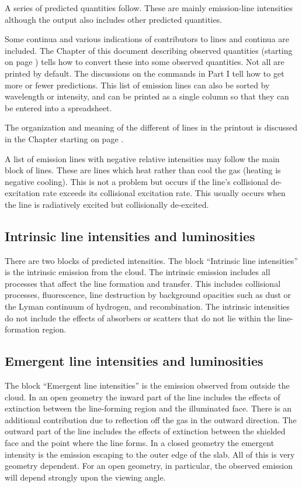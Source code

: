 A series of predicted quantities follow.
These are mainly emission-line
intensities although the output also includes other predicted quantities.

Some continua and various indications of contributors to lines and
continua are included.
The Chapter of this document describing observed
quantities (starting on page \pageref{sec:ObservedQuantities})
tells how to convert these into some observed quantities.
Not all
are printed by default.
The discussions on the  commands in Part I
tell how to get more or fewer predictions.
This list
of emission lines can also be sorted by wavelength or intensity, and can
be printed as a single column so that they can be entered into a spreadsheet.

The organization and meaning of the different of lines in the printout
is discussed in the Chapter 
starting on page \pageref{sec:EmissionLines}.

A list of emission lines with negative relative intensities 
may follow the main block of lines.
These are lines which heat rather than cool the gas (heating
is negative cooling).
This is not a problem but occurs if the line's
collisional de-excitation rate exceeds its collisional excitation rate.
This usually occurs when the line is radiatively excited but collisionally
de-excited.

\subsection{Intrinsic line intensities and luminosities}

There are two blocks of predicted intensities.
The block ``Intrinsic line intensities'' is the intrinsic emission
from the cloud.
The intrinsic
emission includes all processes that affect the line formation and transfer.
This includes collisional processes, fluorescence, line destruction by
background opacities such as dust or the Lyman continuum of hydrogen, and
recombination.
The intrinsic intensities do not include the effects of
absorbers or scatters that do not lie within the line-formation region.

\subsection{Emergent line intensities and luminosities}

The block ``Emergent line intensities'' is the emission observed from
outside the cloud.
In an open geometry the inward part of the line includes
the effects of extinction between the line-forming region and the illuminated
face.
There is an additional contribution due to reflection off the gas
in the outward direction.
The outward part of the line includes the effects
of extinction between the shielded face and the point where the line forms.
In a closed geometry the emergent intensity is the emission escaping to
the outer edge of the slab.
All of this is very geometry dependent.
For an open geometry, in particular, the observed
emission will depend strongly upon the viewing angle.

